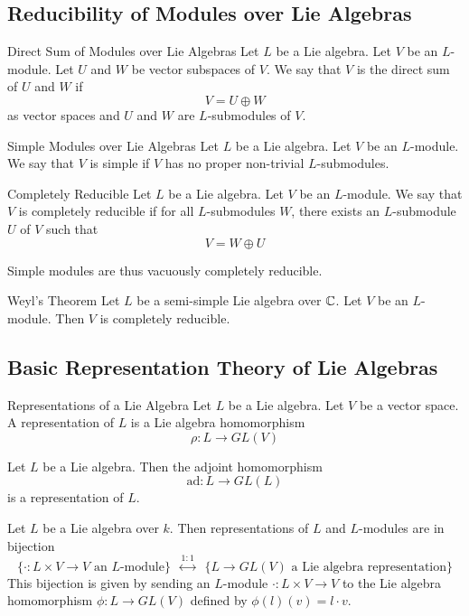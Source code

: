 \documentclass[a4paper]{article}
\begin{document}
\subsection{Reducibility of Modules over Lie Algebras}
\begin{defn}{Direct Sum of Modules over Lie Algebras}{} Let $L$ be a Lie algebra. Let $V$ be an $L$-module. Let $U$ and $W$ be vector subspaces of $V$. We say that $V$ is the direct sum of $U$ and $W$ if $$V=U\oplus W$$ as vector spaces and $U$ and $W$ are $L$-submodules of $V$. 
\end{defn}

\begin{defn}{Simple Modules over Lie Algebras}{} Let $L$ be a Lie algebra. Let $V$ be an $L$-module. We say that $V$ is simple if $V$ has no proper non-trivial $L$-submodules. 
\end{defn}

\begin{defn}{Completely Reducible}{} Let $L$ be a Lie algebra. Let $V$ be an $L$-module. We say that $V$ is completely reducible if for all $L$-submodules $W$, there exists an $L$-submodule $U$ of $V$ such that $$V=W\oplus U$$
\end{defn}

Simple modules are thus vacuously completely reducible. 

\begin{thm}{Weyl's Theorem}{} Let $L$ be a semi-simple Lie algebra over $\mathbb{C}$. Let $V$ be an $L$-module. Then $V$ is completely reducible. 
\end{thm}

\subsection{Basic Representation Theory of Lie Algebras}
\begin{defn}{Representations of a Lie Algebra}{} Let $L$ be a Lie algebra. Let $V$ be a vector space. A representation of $L$ is a Lie algebra homomorphism $$\rho:L\to GL(V)$$
\end{defn}

\begin{lmm}{}{} Let $L$ be a Lie algebra. Then the adjoint homomorphism $$\text{ad}:L\to GL(L)$$ is a representation of $L$. 
\end{lmm}

\begin{prp}{}{} Let $L$ be a Lie algebra over $k$. Then representations of $L$ and $L$-modules are in bijection $$\{\cdot:L\times V\to V\text{ an }L\text{-module}\}\;\;\overset{1:1}{\leftrightarrow}\;\;\{L\to GL(V)\text{ a Lie algebra representation}\}$$ This bijection is given by sending an $L$-module $\cdot:L\times V\to V$ to the Lie algebra homomorphism $\phi:L\to GL(V)$ defined by $\phi(l)(v)=l\cdot v$. 
\end{prp}
\end{document}
